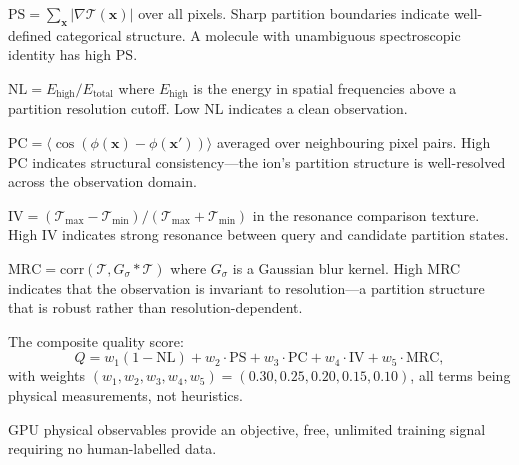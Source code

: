 \begin{definition}
  $\mathrm{PS} = \sum_{\mathbf{x}}|\nabla\mathcal{T}(\mathbf{x})|$ over
  all pixels.  Sharp partition boundaries indicate well-defined categorical
  structure.  A molecule with unambiguous spectroscopic identity has high PS.
\end{definition}

\begin{definition}
  $\mathrm{NL} = E_{\mathrm{high}}/E_{\mathrm{total}}$ where
  $E_{\mathrm{high}}$ is the energy in spatial frequencies above a partition
  resolution cutoff.  Low NL indicates a clean observation.
\end{definition}

\begin{definition}
  $\mathrm{PC} = \langle\cos(\phi(\mathbf{x}) -
  \phi(\mathbf{x}'))\rangle$ averaged over neighbouring pixel pairs.
  High PC indicates structural consistency---the ion's partition
  structure is well-resolved across the observation domain.
\end{definition}

\begin{definition}
  $\mathrm{IV} = (\mathcal{T}_{\max} - \mathcal{T}_{\min})/
  (\mathcal{T}_{\max} + \mathcal{T}_{\min})$ in the resonance comparison
  texture.  High IV indicates strong resonance between query and candidate
  partition states.
\end{definition}

\begin{definition}
  $\mathrm{MRC} = \mathrm{corr}(\mathcal{T}, G_\sigma * \mathcal{T})$
  where $G_\sigma$ is a Gaussian blur kernel.  High MRC indicates that
  the observation is invariant to resolution---a partition structure that
  is robust rather than resolution-dependent.
\end{definition}

The composite quality score:
\begin{equation}
  Q = w_1(1-\mathrm{NL}) + w_2\cdot\mathrm{PS} + w_3\cdot\mathrm{PC}
    + w_4\cdot\mathrm{IV} + w_5\cdot\mathrm{MRC}, \label{eq:ch22-quality}
\end{equation}
with weights $(w_1, w_2, w_3, w_4, w_5) = (0.30, 0.25, 0.20, 0.15, 0.10)$,
all terms being physical measurements, not heuristics.

\begin{theorem}
\label{thm:ch22-objective}
  GPU physical observables provide an objective, free, unlimited training
  signal requiring no human-labelled data.
\end{theorem}


